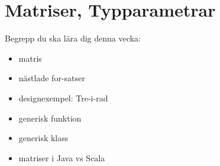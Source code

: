 \chapter{Matriser, Typparametrar}\label{chapter:W09}
Begrepp du ska lära dig denna vecka:
\begin{itemize}[noitemsep,label={$\square$},leftmargin=*]
\item matris
\item nästlade for-satser
\item designexempel: Tre-i-rad
\item generisk funktion
\item generisk klass
\item matriser i Java vs Scala\end{itemize}
